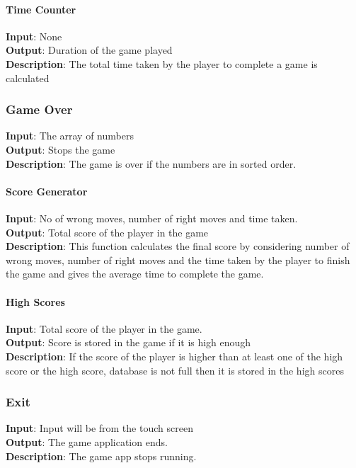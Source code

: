 \documentclass[a4paper,11pt]{article}
\begin{document}
\paragraph{Time Counter}\hfill \break
\textbf{Input}: None\\
\textbf{Output}: Duration of the game played\\
\textbf{Description}: The total time taken by the player to complete a game is calculated

\subsubsection{Game Over}
\textbf{Input}: The array of numbers\\ 
\textbf{Output}: Stops the game\\
\textbf{Description}: The game is over if the numbers are in sorted order.

\paragraph{Score Generator}\hfill \break
\textbf{Input}: No of wrong moves, number of right moves and time taken.\\
\textbf{Output}: Total score of the player in the game\\
\textbf{Description}: This function calculates the final score by considering number of wrong moves, number of right moves and the time taken by the player to finish the game and gives the average time to complete the game. 

\paragraph{High Scores}\hfill \break
\textbf{Input}: Total score of the player in the game.\\
\textbf{Output}: Score is stored in the game if it is high enough\\
\textbf{Description}: If the score of the player is higher than at least one of the high score or the high score, database is not full then it is stored in the high scores

\subsubsection{Exit}
\textbf{Input}: Input will be from the touch screen\\
\textbf{Output}: The game application ends.\\
\textbf{Description}: The game app stops running.
\end{document}
